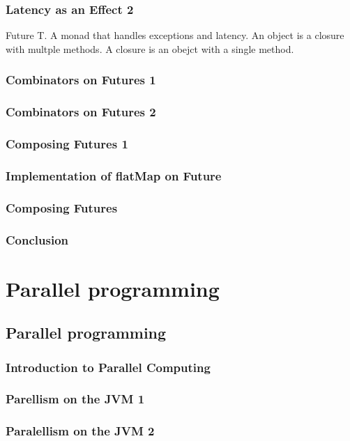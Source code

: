 \documentclass[10pt, a4paper]{report}
\begin{document}
\section{Latency as an Effect 2}

Future T. A monad that handles exceptions and latency. An object is a closure with multple methods. A closure is an obejct with a single method.

\section{Combinators on Futures 1}



\section{Combinators on Futures 2}
\section{Composing Futures 1}
\section{Implementation of flatMap on Future}
\section{Composing Futures}
\section{Conclusion}


\part{Parallel programming}
\chapter{Parallel programming}
\section{Introduction to Parallel Computing}
\section{Parellism on the JVM 1}
\section{Paralellism on the JVM 2}
\end{document}
